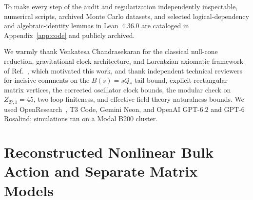 \documentclass[onecolumn,11pt,aps,prd,amsmath,amssymb,nofootinbib,floatfix]{revtex4-2}
\newcommand{\scrD}{\mathscr{D}}
\begin{document}
To make every step of the audit and regularization independently inspectable, numerical scripts, archived Monte Carlo datasets, and selected logical-dependency and algebraic-identity lemmas in Lean~4.36.0 are cataloged in Appendix~\ref{app:code} and publicly archived.

\begin{acknowledgments}
We warmly thank Venkatesa Chandrasekaran for the classical null-cone reduction, gravitational clock architecture, and Lorentzian axiomatic framework of Ref.~\cite{Chandrasekaran2026}, which motivated this work, and thank independent technical reviewers for incisive comments on the $B(s)=s Q_*$ tail bound, explicit rectangular matrix vertices, the corrected oscillator clock bounds, the modular check on $Z_{\scrD,1}=45$, two-loop finiteness, and effective-field-theory naturalness bounds. We used OpenResearch~\cite{openresearch}, T3 Code, Gemini Neon, and OpenAI GPT-6.2 and GPT-6 Rosalind; simulations ran on a Modal B200 cluster.
\end{acknowledgments}

\appendix

\section{Reconstructed Nonlinear Bulk Action and Separate Matrix Models}\label{app:explicit_action}


\end{document}
